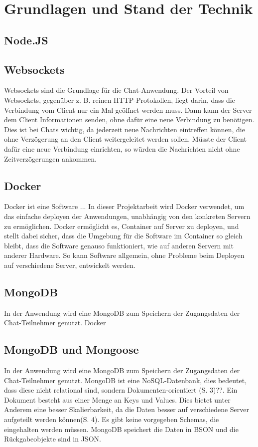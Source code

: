 
\chapter{Grundlagen und Stand der Technik}\label{cha:Grundlagen}
\section{Node.JS}\label{sec:Node.JS}

\section{Websockets}\label{sec:Websockets}
Websockets sind die Grundlage für die Chat-Anwendung. Der Vorteil von Websockets, gegenüber z. B. reinen HTTP-Protokollen, liegt darin, dass die Verbindung vom Client nur ein Mal geöffnet werden muss. Dann kann der Server dem Client Informationen senden, ohne dafür eine neue Verbindung zu benötigen. Dies ist bei Chats wichtig, da jederzeit neue Nachrichten eintreffen können, die ohne Verzögerung an den Client weitergeleitet werden sollen. Müsste der Client dafür eine neue Verbindung einrichten, so würden die Nachrichten nicht ohne Zeitverzögerungen ankommen.
\section{Docker}\label{sec:Docker}
Docker ist eine Software ... In dieser Projektarbeit wird Docker verwendet, um das einfache deployen der Anwendungen, unabhängig von den konkreten Servern zu ermöglichen. Docker ermöglicht es, Container auf Server zu deployen, und stellt dabei sicher, dass die Umgebung für die Software im Container so gleich bleibt, dass die Software genauso funktioniert, wie auf anderen Servern mit anderer Hardware. So kann Software allgemein, ohne Probleme beim Deployen auf verschiedene Server, entwickelt werden.

\section{MongoDB}\label{sec:MongoDB}
In der Anwendung wird eine MongoDB zum Speichern der Zugangsdaten der Chat-Teilnehmer genutzt.
Docker 
\section{MongoDB und Mongoose}\label{sec:MongoDB}
In der Anwendung wird eine MongoDB zum Speichern der Zugangsdaten der Chat-Teilnehmer genutzt.
MongoDB ist eine NoSQL-Datenbank, dies bedeutet, dass diese nicht relational sind, sondern Dokumenten-orientiert (S. 3)??. Ein Dokument besteht aus einer Menge an Keys und Values.
Dies bietet unter Anderem eine besser Skalierbarkeit, da die Daten besser auf verschiedene Server aufgeteilt werden können(S. 4). Es gibt keine vorgegeben Schemas, die eingehalten werden müssen. MongoDB speichert die Daten in BSON und die Rückgabeobjekte sind in JSON.

